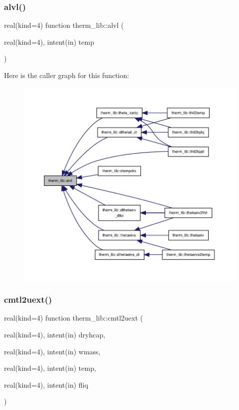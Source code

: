 \subsubsection{\texorpdfstring{alvl()}{alvl()}}
{\footnotesize\ttfamily real(kind=4) function therm\+\_\+lib\+::alvl (\begin{DoxyParamCaption}\item[{real(kind=4), intent(in)}]{temp }\end{DoxyParamCaption})}

Here is the caller graph for this function\+:
\nopagebreak
\begin{figure}[H]
\begin{center}
\leavevmode
\includegraphics[width=350pt]{namespacetherm__lib_a543f4c6ab155d99ad9a5002a8143a654_icgraph}
\end{center}
\end{figure}
\mbox{\label{namespacetherm__lib_a2db60e1f300fadcd09ef451059aa571b}} 
\subsubsection{\texorpdfstring{cmtl2uext()}{cmtl2uext()}}
{\footnotesize\ttfamily real(kind=4) function therm\+\_\+lib\+::cmtl2uext (\begin{DoxyParamCaption}\item[{real(kind=4), intent(in)}]{dryhcap,  }\item[{real(kind=4), intent(in)}]{wmass,  }\item[{real(kind=4), intent(in)}]{temp,  }\item[{real(kind=4), intent(in)}]{fliq }\end{DoxyParamCaption})}

